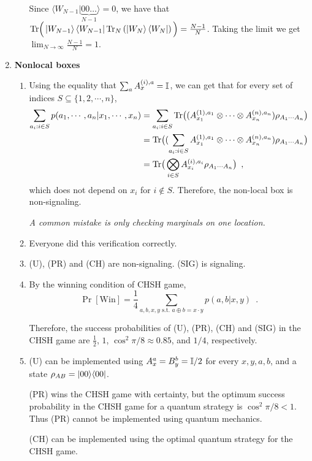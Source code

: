 \documentclass[12pt]{article}
\begin{document}
\begin{enumerate}
\begin{enumerate}
	Since $\langle W_{N-1}|\underbrace{00\ldots}_{N-1}\rangle = 0$, we have that $\mathrm{Tr}\Big(\left| W_{N-1} \right\rangle \left\langle W_{N-1} \right| \mathrm{Tr}_N\left(\left| W_N \right\rangle \left\langle W_N \right|\right)\Big) = \frac{N-1}{N}$. Taking the limit we get $\lim_{N\rightarrow\infty}\frac{N-1}{N} = 1$.
\end{enumerate}

\item {\bf Nonlocal boxes}
\begin{enumerate}
\item Using the equality that $\sum_{a}A_x^{(i), a} = \mathbb{I}$, we can get that for every set of indices $S \subseteq \{1, 2, \cdots, n\}$,
\begin{align*}
\sum_{a_i: i \in S}p(a_1, \cdots, a_n | x_1, \cdots, x_n) &= \sum_{a_i: i \in S}	\mathrm{Tr}\big( (A_{x_1}^{(1),a_1} \otimes \cdots\otimes A_{x_n}^{(n),a_n}) \rho_{A_1\cdots A_n}\big)\\
&= \mathrm{Tr}\big( (\sum_{a_i: i \in S}A_{x_1}^{(1),a_1} \otimes \cdots\otimes A_{x_n}^{(n),a_n}) \rho_{A_1\cdots A_n}\big)\\
&= \mathrm{Tr}\big( \bigotimes_{i \in S} A_{x_i}^{(i),a_i} \rho_{A_1\cdots A_n} \big)\enspace,
\end{align*}
which does not depend on $x_i$ for $i \notin S$. Therefore, the non-local box is non-signaling.

\textit{A common mistake is only checking marginals on one location.}
\item Everyone did this verification correctly.
\item (U), (PR) and (CH) are non-signaling. (SIG) is signaling.
\item By the winning condition of CHSH game, 
\[\Pr\left[\text{Win}\right] = \frac{1}{4}\sum_{a, b, x, y \text{ s.t. }a \oplus b = x \cdot y}p(a, b| x, y)\enspace.\]

Therefore, the success probabilities of (U), (PR), (CH) and (SIG) in the CHSH game are $\frac{1}{2}$, $1$, $\cos^2 \pi / 8 \approx 0.85$, and $1/4$, respectively.

\item (U) can be implemented using $A_x^a = B_y^b = \mathbb{I}/2$ for every $x, y, a, b$, and a state $\rho_{AB} = \ket{00}\!\bra{00}$.

(PR) wins the CHSH game with certainty, but the optimum success probability in the CHSH game for a quantum strategy is $\cos^2 \pi/8 < 1$. Thus (PR) cannot be implemented using quantum mechanics.

(CH) can be implemented using the optimal quantum strategy for the CHSH game.


\end{enumerate}
\end{enumerate}
\end{document}
